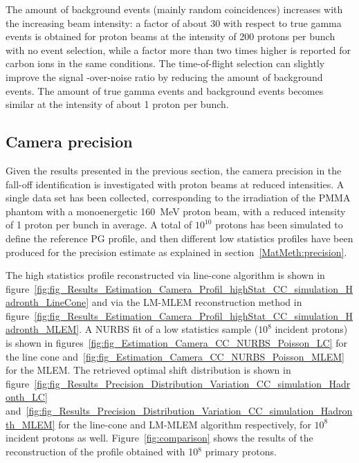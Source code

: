The amount of background events (mainly random coincidences) increases with the increasing beam intensity: a factor of about 30 with respect to true gamma events is obtained for proton beams at  the intensity of 200 protons per bunch with no event selection, while a factor more than two times higher is reported for carbon ions in the same conditions. The time-of-flight selection can slightly improve the signal -over-noise ratio by reducing the amount of background events. The amount of true gamma events and background events becomes similar at the intensity of about 1 proton per bunch.


\subsection{Camera precision}
\label{Results::precision_reconstruction}
Given the results presented in the previous section, the camera precision in the fall-off identification is investigated with proton beams at reduced intensities.
A single data set has been collected, corresponding to the irradiation of the PMMA phantom with a monoenergetic 160~MeV  proton beam, with a reduced intensity of 1 proton per bunch in average. A total of $10^{10}$ protons has been simulated to define the reference PG profile, and then different low statistics profiles have been produced for the precision estimate as explained in section~\ref{MatMeth:precision}. 

The high statistics profile reconstructed via line-cone algorithm is shown in figure~\ref{fig:fig_Results_Estimation_Camera_Profil_highStat_CC_simulation_Hadronth_LineCone} and via the LM-MLEM reconstruction method in figure~\ref{fig:fig_Results_Estimation_Camera_Profil_highStat_CC_simulation_Hadronth_MLEM}. A NURBS fit of a low statistics sample ($10^8$ incident protons) is shown in figures~\ref{fig:fig_Estimation_Camera_CC_NURBS_Poisson_LC} for the line cone and~\ref{fig:fig_Estimation_Camera_CC_NURBS_Poisson_MLEM} for the MLEM.
The retrieved optimal shift distribution is shown in figure~\ref{fig:fig_Results_Precision_Distribution_Variation_CC_simulation_Hadronth_LC} and~\ref{fig:fig_Results_Precision_Distribution_Variation_CC_simulation_Hadronth_MLEM} for the line-cone and LM-MLEM algorithm respectively, for $10^8$ incident protons as well.
Figure~\ref{fig:comparison} shows the results of the reconstruction of the profile obtained with 10$^8$ primary protons.


